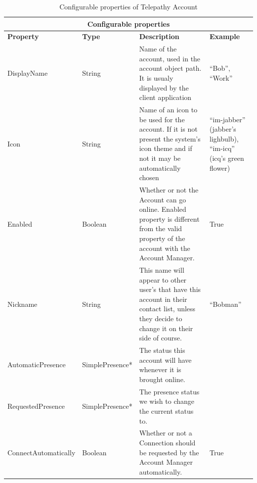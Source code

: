 \begin{center}
\begin{table}
	\begin{tabular}{|l|l|p{4.5cm}|p{3cm}|}
		\hline
			\multicolumn{4}{|c|}{{\bf Configurable properties}} \\
		\hline
			{\bf Property} & {\bf Type} & {\bf Description} & {\bf Example} \\
		\hline
			DisplayName & String & Name of the account, used in the account object path. It is usualy displayed by the client application & ``Bob'', ``Work'' \\
		\hline
			Icon & String & Name of an icon to be used for the account. If it is not present the system's icon theme and if not it may be automatically chosen & ``im-jabber'' (jabber's lighbulb), ``im-icq'' (icq's green flower) \\
		\hline
			Enabled & Boolean & Whether or not the Account can go online. Enabled property is different from the valid property of the account with the Account Manager.& True\\
		\hline
		   Nickname & String & This name will appear to other user's that have this account in their contact list, unless they decide to change it on their side of course. & ``Bobman'' \\
		\hline
			AutomaticPresence & SimplePresence* & The status this account will have whenever it is brought online. & \\
		\hline
			RequestedPresence & SimplePresence* & The presence status we wish to change the current status to. & \\
		\hline
			ConnectAutomatically & Boolean & Whether or not a Connection should be requested by the Account Manager automatically. & True \\
		\hline
	\end{tabular}
	\label{table:configureableProperties}
	\caption{Configurable properties of Telepathy Account\cite{tpWikiAccount}}
\end{table}
\end{center}

